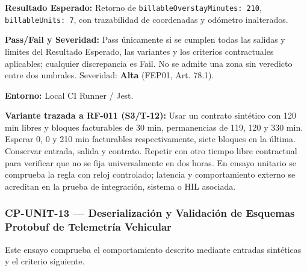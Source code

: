 \par\noindent\textbf{Resultado Esperado:} Retorno de \texttt{b\allowbreak{}i\allowbreak{}l\allowbreak{}l\allowbreak{}a\allowbreak{}b\allowbreak{}l\allowbreak{}e\allowbreak{}O\allowbreak{}v\allowbreak{}e\allowbreak{}r\allowbreak{}s\allowbreak{}t\allowbreak{}a\allowbreak{}y\allowbreak{}M\allowbreak{}i\allowbreak{}n\allowbreak{}u\allowbreak{}t\allowbreak{}e\allowbreak{}s\allowbreak{}:\allowbreak{} 2\allowbreak{}1\allowbreak{}0\allowbreak{}}, \texttt{b\allowbreak{}i\allowbreak{}l\allowbreak{}l\allowbreak{}a\allowbreak{}b\allowbreak{}l\allowbreak{}e\allowbreak{}U\allowbreak{}n\allowbreak{}i\allowbreak{}t\allowbreak{}s\allowbreak{}:\allowbreak{} 7\allowbreak{}}, con trazabilidad de coordenadas y odómetro inalterados.\par
\par\noindent\textbf{Pass/Fail y Severidad:} Pass únicamente si se cumplen todas las salidas y límites del Resultado Esperado, las variantes y los criterios contractuales aplicables; cualquier discrepancia es Fail. No se admite una zona sin veredicto entre dos umbrales. Severidad: \textbf{Alta} (FEP01, Art. 78.1).\par
\par\noindent\textbf{Entorno:} Local CI Runner / Jest.\par







\par\noindent\textbf{Variante trazada a RF-011 (S3/T-12):} Usar un contrato sintético con 120 min libres y bloques facturables de 30 min, permanencias de 119, 120 y 330 min. Esperar 0, 0 y 210 min facturables respectivamente, siete bloques en la última. Conservar entrada, salida y contrato. Repetir con otro tiempo libre contractual para verificar que no se fija universalmente en dos horas. En ensayo unitario se comprueba la regla con reloj controlado; latencia y comportamiento externo se acreditan en la prueba de integración, sistema o HIL asociada.\par
\subsubsection*{CP-UNIT-13 — Deserialización y Validación de Esquemas Protobuf de Telemetría Vehicular}\label{sec:9-cp-unit-13}

Este ensayo comprueba el comportamiento descrito mediante entradas sintéticas y el criterio siguiente.

